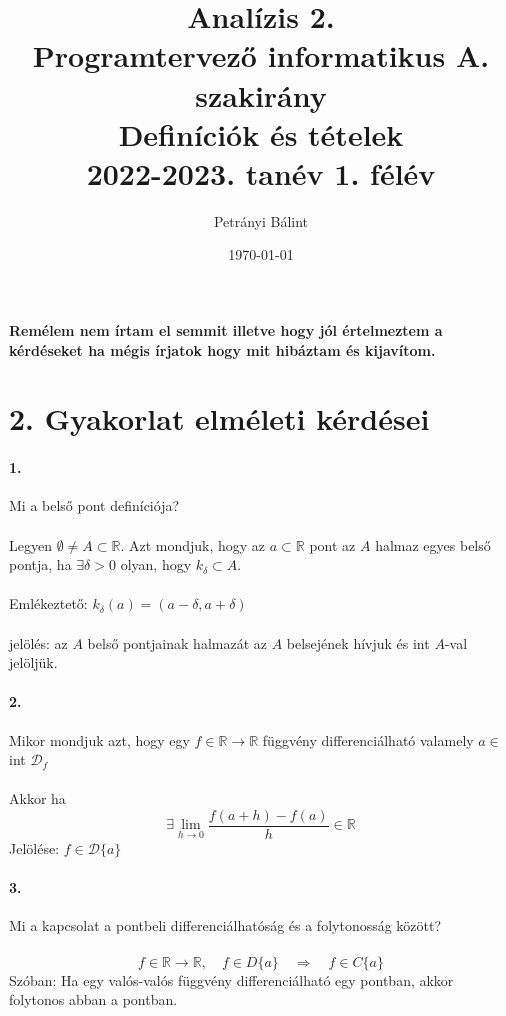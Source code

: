 \documentclass[10pt,a4paper]{article}
\date{\today}
\author{Petrányi Bálint}
\title{%
	\textbf{Analízis 2.} \\
	\textbf{Programtervező informatikus A. szakirány} \\
	\medskip
	Definíciók és tételek\\
	\large 2022-2023. tanév 1. félév
}
\renewcommand{\>}{\rightarrow}
\begin{document}
\maketitle
\textbf{Remélem nem írtam el semmit illetve hogy jól értelmeztem a kérdéseket ha mégis írjatok hogy mit hibáztam és kijavítom.}

\tableofcontents
\newpage



\section{2. Gyakorlat elméleti kérdései}
\paragraph{1.}
Mi a belső pont definíciója? \\
\\
Legyen $\emptyset \neq A \subset \mathbb{R}$. Azt mondjuk, hogy az $a \subset 	\mathbb{R}$ pont az $A$ halmaz egyes belső pontja, ha $\exists \delta > 0$ olyan, hogy $k_{\delta} \subset A$. \\ \\
Emlékeztető: $k_{\delta}(a)=(a-\delta , a+\delta)$ \\ \\
jelölés: az $A$ belső pontjainak halmazát az $A$ belsejének hívjuk és int $A$-val jelöljük. 

\paragraph{2.}
Mikor mondjuk azt, hogy egy $f \in \mathbb{R} \rightarrow \mathbb{R}$ függvény differenciálható valamely $a \in$ int $\mathcal{D}_f$ \\
\\ 
Akkor ha
\[
\exists \lim_{h \rightarrow 0}{ \frac{f(a+h)-f(a)}{h}} \in \mathbb{R}
\]
Jelölése: $f \in \mathcal{D} \{a\}$

\paragraph{3.}
Mi a kapcsolat a pontbeli differenciálhatóság és a folytonosság között?\\
\\
\[
f \in \mathbb{R} \rightarrow \mathbb{R}, \quad f \in D\{a\} \quad \Longrightarrow \quad  f \in C\{a\}
\]
Szóban: Ha egy valós-valós függvény differenciálható egy pontban, akkor folytonos abban a pontban.
\end{document}
